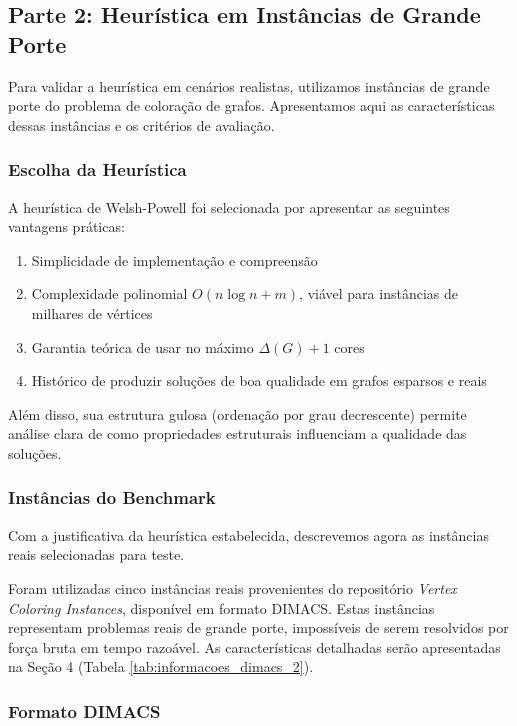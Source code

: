 \documentclass[12pt]{article}
\begin{document}
\subsection{Parte 2: Heurística em Instâncias de Grande Porte}

Para validar a heurística em cenários realistas, utilizamos instâncias de grande porte do problema de coloração de grafos. Apresentamos aqui as características dessas instâncias e os critérios de avaliação.

\subsubsection{Escolha da Heurística}

A heurística de Welsh-Powell foi selecionada por apresentar as seguintes vantagens práticas:

\begin{enumerate}
    \item Simplicidade de implementação e compreensão
    \item Complexidade polinomial $O(n \log n + m)$, viável para instâncias de milhares de vértices
    \item Garantia teórica de usar no máximo $\Delta(G) + 1$ cores
    \item Histórico de produzir soluções de boa qualidade em grafos esparsos e reais
\end{enumerate}

Além disso, sua estrutura gulosa (ordenação por grau decrescente) permite análise clara de como propriedades estruturais influenciam a qualidade das soluções.

\subsubsection{Instâncias do Benchmark}

Com a justificativa da heurística estabelecida, descrevemos agora as instâncias reais selecionadas para teste.

Foram utilizadas cinco instâncias reais provenientes do repositório \textit{Vertex Coloring Instances}, disponível em formato DIMACS. Estas instâncias representam problemas reais de grande porte, impossíveis de serem resolvidos por força bruta em tempo razoável. As características detalhadas serão apresentadas na Seção 4 (Tabela \ref{tab:informacoes_dimacs_2}).

\subsubsection{Formato DIMACS}
\end{document}

